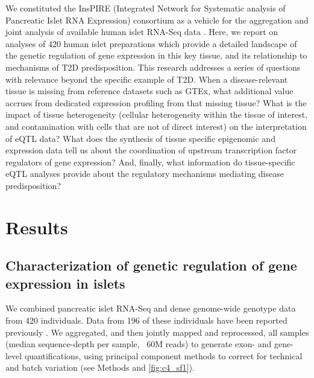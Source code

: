 We constituted the InsPIRE (Integrated Network for Systematic analysis of Pancreatic Islet RNA Expression) consortium as a vehicle for the aggregation and joint analysis of available human islet RNA-Seq data \cite{varshneyGeneticRegulatorySignatures2017, fadistaGlobalGenomicTranscriptomic2014, vandebuntTranscriptExpressionData2015}. Here, we report on analyses of 420 human islet preparations which provide a detailed landscape of the genetic regulation of gene expression in this key tissue, and its relationship to mechanisms of T2D predisposition.
This research addresses a series of questions with relevance beyond the specific example of T2D. When a disease-relevant tissue is missing from reference datasets such as GTEx, what additional value accrues from dedicated expression profiling from that missing tissue? What is the impact of tissue heterogeneity (cellular heterogeneity within the tissue of interest, and contamination with cells that are not of direct interest) on the interpretation of eQTL data? What does the synthesis of tissue specific epigenomic and expression data tell us about the coordination of upstream transcription factor regulators of gene expression? And, finally, what information do tissue-specific eQTL analyses provide about the regulatory mechanisms mediating disease predisposition? 

\section{Results}
   
\subsection{Characterization of genetic regulation of gene expression in islets}
We combined pancreatic islet RNA-Seq and dense genome-wide genotype data from 420 individuals. Data from 196 of these individuals have been reported previously \cite{varshneyGeneticRegulatorySignatures2017, fadistaGlobalGenomicTranscriptomic2014, vandebuntTranscriptExpressionData2015}. We aggregated, and then jointly mapped and reprocessed, all samples (median sequence-depth per sample, ~60M reads) to generate exon- and gene-level quantifications, using principal component methods to correct for technical and batch variation (see Methods and \ref{fig:c4_sf1}). \\

